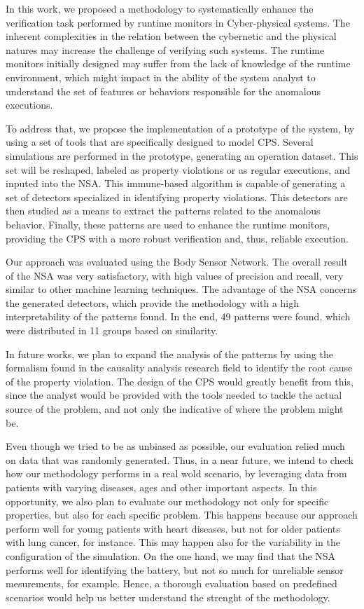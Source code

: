\label{sec:Conclusion}
In this work, we proposed a methodology to systematically enhance the verification task performed by runtime monitors in Cyber-physical systems. The inherent complexities in the relation between the cybernetic and the physical natures may increase the challenge of verifying such systems. The runtime monitors initially designed may suffer from the lack of knowledge of the runtime environment, which might impact in the ability of the system analyst to understand the set of features or behaviors responsible for the anomalous executions. 

To address that, we propose the implementation of a prototype of the system, by using a set of tools that are specifically designed to model CPS. Several simulations are performed in the prototype, generating an operation dataset. This set will be reshaped, labeled as property violations or as regular executions, and inputed into the NSA. This immune-based algorithm is capable of generating a set of detectors specialized in identifying property violations. This detectors are then studied as a means to extract the patterns related to the anomalous behavior. Finally, these patterns are used to enhance the runtime monitors, providing the CPS with a more robust verification and, thus, reliable execution.

Our approach was evaluated using the Body Sensor Network. The overall result of the NSA was very satisfactory, with high values of precision and recall, very similar to other machine learning techniques. The advantage of the NSA concerns the generated detectors, which provide the methodology with a high interpretability of the patterns found. In the end, 49 patterns were found, which were distributed in 11 groups based on similarity.

In future works, we plan to expand the analysis of the patterns by using the formalism found in the causality analysis research field to identify the root cause of the property violation. The design of the CPS would greatly benefit from this, since the analyst would be provided with the tools needed to tackle the actual source of the problem, and not only the indicative of where the problem might be. 

Even though we tried to be as unbiased as possible, our evaluation relied much on data that was randomly generated. Thus, in a near future, we intend to check how our methodology performs in a real wold scenario, by leveraging data from patients with varying diseases, ages and other important aspects. In this opportunity, we also plan to evaluate our methodology not only for specific properties, but also for each specific problem. This happens because our approach perform well for young patients with heart diseases, but not for older patients with lung cancer, for instance. This may happen also for the variability in the configuration of the simulation. On the one hand, we may find that the NSA performs well for identifying the battery, but not so much for unreliable sensor mesurements, for example. Hence, a thorough evaluation based on predefined scenarios would help us better understand the strenght of the methodology.

